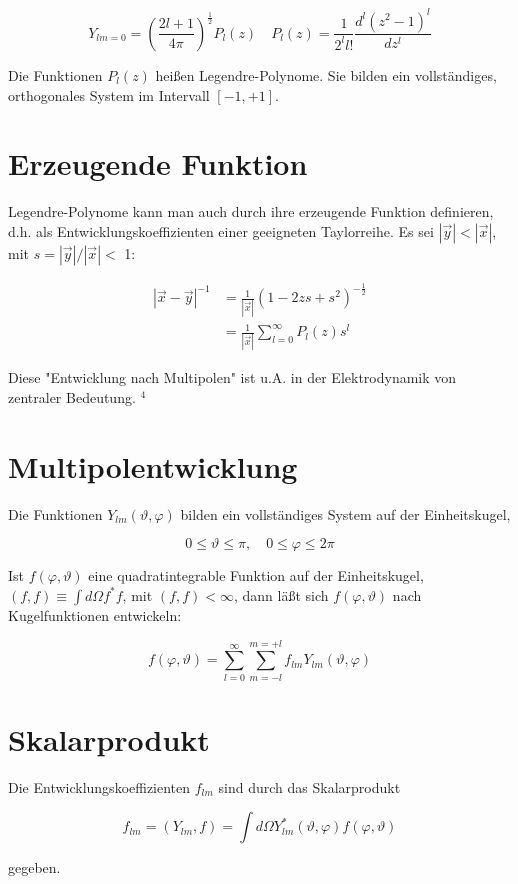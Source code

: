\documentclass[10pt, letterpaper]{article}
\begin{document}
$$
Y_{l m=0}=\left(\frac{2 l+1}{4 \pi}\right)^{\frac{1}{2}} P_{l}(z) \quad P_{l}(z)=\frac{1}{2^{l} l!} \frac{d^{l}\left(z^{2}-1\right)^{l}}{d z^{l}}
$$

Die Funktionen $P_{l}(z)$ heißen Legendre-Polynome. Sie bilden ein vollständiges, orthogonales System im Intervall $[-1,+1]$.

\section*{Erzeugende Funktion}
Legendre-Polynome kann man auch durch ihre erzeugende Funktion definieren, d.h. als Entwicklungskoeffizienten einer geeigneten Taylorreihe. Es sei $|\vec{y}|<|\vec{x}|$, mit $s=|\vec{y}| /|\vec{x}|<$ 1:

$$
\begin{aligned}
|\vec{x}-\vec{y}|^{-1} & =\frac{1}{|\vec{x}|}\left(1-2 z s+s^{2}\right)^{-\frac{1}{2}} \\
& =\frac{1}{|\vec{x}|} \sum_{l=0}^{\infty} P_{l}(z) s^{l}
\end{aligned}
$$

Diese "Entwicklung nach Multipolen" ist u.A. in der Elektrodynamik von zentraler Bedeutung. ${ }^{4}$

\section*{Multipolentwicklung}
Die Funktionen $Y_{l m}(\vartheta, \varphi)$ bilden ein vollständiges System auf der Einheitskugel,

$$
0 \leq \vartheta \leq \pi, \quad 0 \leq \varphi \leq 2 \pi
$$

Ist $f(\varphi, \vartheta)$ eine quadratintegrable Funktion auf der Einheitskugel, $(f, f) \equiv \int d \Omega f^{*} f$, mit $(f, f)<\infty$, dann läßt sich $f(\varphi, \vartheta)$ nach Kugelfunktionen entwickeln:

$$
f(\varphi, \vartheta)=\sum_{l=0}^{\infty} \sum_{m=-l}^{m=+l} f_{l m} Y_{l m}(\vartheta, \varphi)
$$

\section*{Skalarprodukt}
Die Entwicklungskoeffizienten $f_{l m}$ sind durch das Skalarprodukt

$$
f_{l m}=\left(Y_{l m}, f\right)=\int d \Omega Y_{l m}^{*}(\vartheta, \varphi) f(\varphi, \vartheta)
$$

gegeben.
\end{document}
